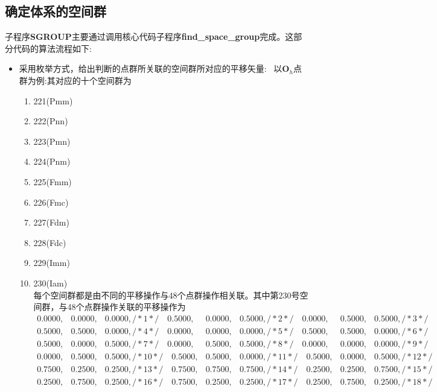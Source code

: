 \documentclass{article}      %
\begin{document}
\subsection{确定体系的空间群}
子程序\textbf{SGROUP}主要通过调用核心代码子程序\textbf{find\_space\_group}完成。这部分代码的算法流程如下:
\begin{itemize}
	\item 采用枚举方式，给出判断的点群所关联的空间群所对应的平移矢量:~
		以$\mathbf{O}_h$点群为例:其对应的十个空间群为
		\begin{enumerate}
			\item 221(P\;m\;-3\;m)
			\item 222(P\;n\;n) 
			\item 223(P\;m\;-3\;n)
			\item 224(P\;n\;m) 
			\item 225(F\;m\;-3\;m)
			\item 226(F\;m\;c)
			\item 227(F\;d\;m) 
			\item 228(F\;d\;c) 
			\item 229(I\;m\;-3\;m)
			\item 230(I\;a\;m)\\
				每个空间群都是由不同的平移操作与48个点群操作相关联。其中第230号空间群，与48个点群操作关联的平移操作为
				\begin{displaymath}
				\begin{matrix}
     0.0000, & 0.0000, & 0.0000, /*    1  */ \quad 0.5000, & 0.0000, & 0.5000, /*    2  */ \quad 0.0000, & 0.5000, & 0.5000, /*    3  */\\
     0.5000, & 0.5000, & 0.0000, /*    4  */ \quad 0.0000, & 0.0000, & 0.0000, /*    5  */ \quad 0.5000, & 0.5000, & 0.0000, /*    6  */ \\
     0.5000, & 0.0000, & 0.5000, /*    7  */ \quad 0.0000, & 0.5000, & 0.5000, /*    8  */ \quad 0.0000, & 0.0000, & 0.0000, /*    9  */ \\
     0.0000, & 0.5000, & 0.5000, /*    10  */\quad 0.5000, & 0.5000, & 0.0000, /*    11  */\quad 0.5000, & 0.0000, & 0.5000, /*    12  */\\
     0.7500, & 0.2500, & 0.2500, /*    13  */\quad 0.7500, & 0.7500, & 0.7500, /*    14  */\quad 0.2500, & 0.2500, & 0.7500, /*    15  */\\
     0.2500, & 0.7500, & 0.2500, /*    16  */\quad 0.7500, & 0.2500, & 0.2500, /*    17  */\quad 0.2500, & 0.7500, & 0.2500, /*    18  */\\

\end{matrix}
\end{displaymath}
\end{enumerate}
\end{itemize}
\end{document}
